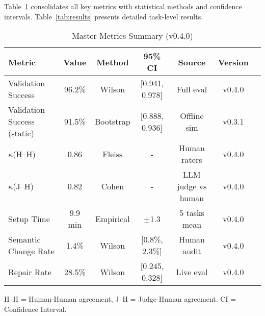 \documentclass[sigconf]{acmart}
\begin{document}
Table~\ref{tab:master_metrics} consolidates all key metrics with statistical methods and confidence intervals. Table~\ref{tab:results} presents detailed task-level results.

\begin{table}[H]
\centering
\caption{Master Metrics Summary (v0.4.0)}
\label{tab:master_metrics}
\scriptsize
\begin{tabular}{@{}lcccccc@{}}
\toprule
\textbf{Metric} & \textbf{Value} & \textbf{Method} & \textbf{95\% CI} & \textbf{Source} & \textbf{Version} \\
\midrule
Validation Success & 96.2\% & Wilson & [0.941, 0.978] & Full eval & v0.4.0 \\
Validation Success (static) & 91.5\% & Bootstrap & [0.888, 0.936] & Offline sim & v0.3.1 \\
\(\kappa\)(H–H) & 0.86 & Fleiss & - & Human raters & v0.4.0 \\
\(\kappa\)(J–H) & 0.82 & Cohen & - & LLM judge vs human & v0.4.0 \\
Setup Time & 9.9 min & Empirical & \(\pm\)1.3 & 5 tasks mean & v0.4.0 \\
Semantic Change Rate & 1.4\% & Wilson & [0.8\%, 2.3\%] & Human audit & v0.4.0 \\
Repair Rate & 28.5\% & Wilson & [0.245, 0.328] & Live eval & v0.4.0 \\
\bottomrule
\end{tabular}
\vspace{1mm}
\scriptsize H–H = Human-Human agreement, J–H = Judge-Human agreement. CI = Confidence Interval.
\end{table}
\end{document}
